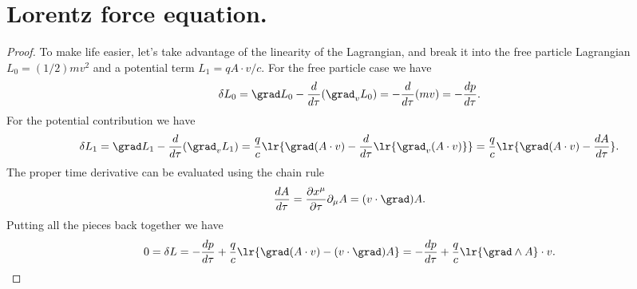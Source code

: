 \section{Lorentz force equation.}
\begin{proof}
To make life easier, let's take advantage of the linearity of the Lagrangian, and break it into the free particle Lagrangian \( L_0 = (1/2) m v^2 \) and a potential term \( L_1 = q A \cdot v/c \).  For the free particle case we have
\begin{dmath}\label{eqn:lorentzForceCovariant:240}
\delta L_0
= \grad L_0 - \frac{d}{d\tau} (\grad_v L_0)
=           - \frac{d}{d\tau} (m v)
= - \frac{dp}{d\tau}.
\end{dmath}
For the potential contribution we have
\begin{dmath}\label{eqn:lorentzForceCovariant:260}
\delta L_1
= \grad L_1 - \frac{d}{d\tau} (\grad_v L_1)
= \frac{q}{c} \lr{ \grad (A \cdot v) - \frac{d}{d\tau} \lr{ \grad_v (A \cdot v)} }
= \frac{q}{c} \lr{ \grad (A \cdot v) - \frac{dA}{d\tau} }.
\end{dmath}
The proper time derivative can be evaluated using the chain rule
\begin{equation}\label{eqn:lorentzForceCovariant:280}
\frac{dA}{d\tau}
=
\frac{\partial x^\mu}{\partial \tau} \partial_\mu A
= (v \cdot \grad) A.
\end{equation}
Putting all the pieces back together we have
\begin{dmath}\label{eqn:lorentzForceCovariant:300}
0 =
\delta L
=
-\frac{dp}{d\tau} + \frac{q}{c} \lr{ \grad (A \cdot v) -  (v \cdot \grad) A }
=
-\frac{dp}{d\tau} + \frac{q}{c} \lr{ \grad \wedge A } \cdot v.
\end{dmath}
\end{proof}
